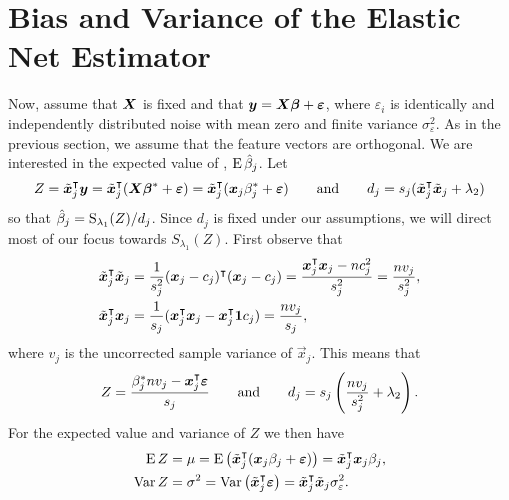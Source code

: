 \section{Bias and Variance of the Elastic Net Estimator}\label{sec:theory}


Now, assume that \(\boldsymbol{X}\) is fixed and that \(\boldsymbol{y} = \boldsymbol{X}\boldsymbol{\beta} + \boldsymbol{\varepsilon}\), where \(\varepsilon_i\) is identically and independently distributed noise with mean zero and finite variance \(\sigma_\varepsilon^2\). As in the previous section, we assume that the feature vectors are orthogonal. We are interested in the expected value of , \(\operatorname{E} \hat{\beta}_j\). Let
\[
  Z = \tilde{\boldsymbol{x}}_j^\intercal \boldsymbol{y} = \tilde{\boldsymbol{x}}_j^\intercal(\boldsymbol{X}\boldsymbol{\beta}^* + \boldsymbol{\varepsilon}) = \tilde{\boldsymbol{x}}_j^\intercal (\boldsymbol{x}_j\beta_j^* + \boldsymbol{\varepsilon})
  \qquad
  \text{and}
  \qquad
  d_j = s_j(\tilde{\boldsymbol{x}}_j^\intercal \tilde{\boldsymbol{x}}_j + \lambda_2)
\]
so that \(\hat{\beta}_j = \operatorname{S}_{\lambda_1}(Z)/d_j\). Since \(d_j\) is fixed under our assumptions, we will direct most of our focus towards \(S_{\lambda_1}(Z)\). First observe that
\[
  \begin{aligned}
    \tilde{\boldsymbol{x}}_j^\intercal \tilde{\boldsymbol{x}}_j & = \frac{1}{s_j^2}(\boldsymbol{x}_j - c_j)^\intercal (\boldsymbol{x}_j - c_j) = \frac{\boldsymbol{x}_j^\intercal\boldsymbol{x}_j - nc_j^2}{s^2_j} = \frac{n v_j}{s_j^2}, \\
    \tilde{\boldsymbol{x}}_j^\intercal \boldsymbol{x}_j         & = \frac{1}{s_j}(\boldsymbol{x}_j^\intercal \boldsymbol{x}_j - \boldsymbol{x}_j^\intercal \boldsymbol{1} c_j) = \frac{n v_j}{s_j},
  \end{aligned}
\]
where \(v_j\) is the uncorrected sample variance of \(\vec{x}_j\). This means that
\begin{equation}
  \label{eq:z-d}
  Z = \frac{\beta_j^* n v_j- \boldsymbol{x}_j^\intercal \boldsymbol{\varepsilon}}{s_j}
  \qquad\text{and}\qquad
  d_j = s_j\left(\frac{n v_j}{s_j^2} + \lambda_2\right).
\end{equation}
For the expected value and variance of \(Z\) we then have
\begin{align*}
  \operatorname{E} Z   & = \mu = \operatorname{E} \left( \tilde{\boldsymbol{x}}_j^\intercal (\boldsymbol{x}_j\beta_j + \boldsymbol{\varepsilon}) \right)  = \tilde{\boldsymbol{x}}_j^\intercal\boldsymbol{x}_j \beta_j,      \\
  \operatorname{Var} Z & = \sigma^2 = \operatorname{Var}\left(\tilde{\boldsymbol{x}}_j ^\intercal \boldsymbol{\varepsilon}\right) = \tilde{\boldsymbol{x}}_j^\intercal \tilde{\boldsymbol{x}}_j\sigma_\varepsilon^2 .
\end{align*}

